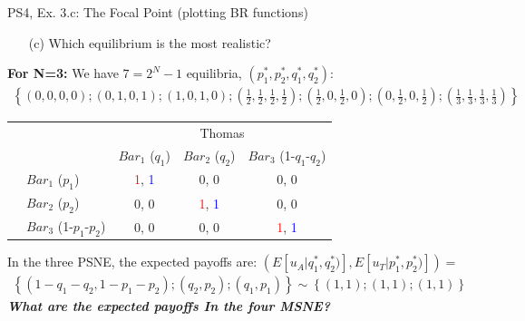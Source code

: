 \begin{frame}{PS4, Ex. 3.c: The Focal Point (plotting BR functions)}
    \begin{itemize}
      \item[(c)] Which equilibrium is the most realistic?
    \end{itemize}
    \textbf{For N=3:} We have $7=2^N-1$ equilibria, $(p_1^{*},p_2^{*},q_1^{*},q_2^{*})$:
    \begin{align*}
      \left\{(0,0,0,0);(0,1,0,1);(1,0,1,0)
      ;\left(\frac{1}{2},\frac{1}{2},\frac{1}{2},\frac{1}{2}\right)
      ;\left(\frac{1}{2},0,\frac{1}{2},0\right)
      ;\left(0,\frac{1}{2},0,\frac{1}{2}\right)
      ;\left(\frac{1}{3},\frac{1}{3},\frac{1}{3},\frac{1}{3}\right)
      \right\}
    \end{align*}
    \vspace{-18pt}
    \begin{table}
      \begin{tabular}{cl|c|c|c|}
        & \multicolumn{1}{c}{} & \multicolumn{3}{c}{\color{blue}Thomas}\\
        & \multicolumn{1}{c}{} & \multicolumn{1}{c}{$Bar_1$ ($q_1$)} & \multicolumn{1}{c}{$Bar_2$ ($q_2$)} & \multicolumn{1}{c}{$Bar_3$ (1-$q_1$-$q_2$)} \\\cline{3-5}
        \parbox[t]{1mm}{}
        & $Bar_1$ ($p_1$) & \textcolor{red}{1}, \textcolor{blue}{1} & 0, 0 & 0, 0 \\
        & $Bar_2$ ($p_2$) & 0, 0 & \textcolor{red}{1}, \textcolor{blue}{1} & 0, 0 \\
        & $Bar_3$ (1-$p_1$-$p_2$) & 0, 0 & 0, 0 & \textcolor{red}{1}, \textcolor{blue}{1} \\
      \end{tabular}
    \end{table}
    In the three PSNE, the expected payoffs are: $\left(E[u_A|q_1^{*},q_2^{*})],E[u_T|p_1^{*},p_2^{*})]\right)=$
    \begin{align*}
      \left\{(1-q_1-q_2,1-p_1-p_2);(q_2,p_2);(q_1,p_1)\right\}\sim
      \left\{(1,1);(1,1);(1,1)\right\}
    \end{align*}
    \textbf{\textit{What are the expected payoffs In the four MSNE?}}
\end{frame}
